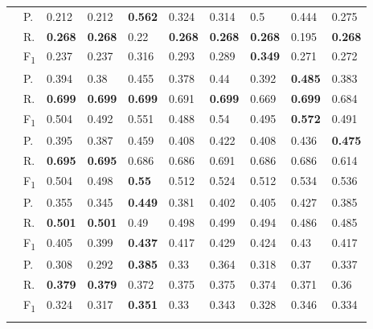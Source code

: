 \begin{tabularx}{\textwidth}{p{1.3em}l Z  Z  Z  Z  Z  Z  Z  Z }
    & P.    & 0.212    & 0.212    & \textbf{ 0.562 }    & 0.324    & 0.314    & 0.5    & 0.444    & 0.275 \\
    & R.    & \textbf{ 0.268 }    & \textbf{ 0.268 }    & 0.22    & \textbf{ 0.268 }    & \textbf{ 0.268 }    & \textbf{ 0.268 }    & 0.195    & \textbf{ 0.268 } \\
    & F\textsubscript{1}    & 0.237    & 0.237    & 0.316    & 0.293    & 0.289    & \textbf{ 0.349 }    & 0.271    & 0.272 \\
     \midrule {}

    & P.    & 0.394    & 0.38    & 0.455    & 0.378    & 0.44    & 0.392    & \textbf{ 0.485 }    & 0.383 \\
    & R.    & \textbf{ 0.699 }    & \textbf{ 0.699 }    & \textbf{ 0.699 }    & 0.691    & \textbf{ 0.699 }    & 0.669    & \textbf{ 0.699 }    & 0.684 \\
    & F\textsubscript{1}    & 0.504    & 0.492    & 0.551    & 0.488    & 0.54    & 0.495    & \textbf{ 0.572 }    & 0.491 \\
     \midrule {}

    & P.    & 0.395    & 0.387    & 0.459    & 0.408    & 0.422    & 0.408    & 0.436    & \textbf{ 0.475 } \\
    & R.    & \textbf{ 0.695 }    & \textbf{ 0.695 }    & 0.686    & 0.686    & 0.691    & 0.686    & 0.686    & 0.614 \\
    & F\textsubscript{1}    & 0.504    & 0.498    & \textbf{ 0.55 }    & 0.512    & 0.524    & 0.512    & 0.534    & 0.536 \\
     \midrule {}

    & P.    & 0.355    & 0.345    & \textbf{ 0.449 }    & 0.381    & 0.402    & 0.405    & 0.427    & 0.385 \\
    & R.    & \textbf{ 0.501 }    & \textbf{ 0.501 }    & 0.49    & 0.498    & 0.499    & 0.494    & 0.486    & 0.485 \\
    & F\textsubscript{1}    & 0.405    & 0.399    & \textbf{ 0.437 }    & 0.417    & 0.429    & 0.424    & 0.43    & 0.417 \\
     \midrule {}

    & P.    & 0.308    & 0.292    & \textbf{ 0.385 }    & 0.33    & 0.364    & 0.318    & 0.37    & 0.337 \\
    & R.    & \textbf{ 0.379 }    & \textbf{ 0.379 }    & 0.372    & 0.375    & 0.375    & 0.374    & 0.371    & 0.36 \\
    & F\textsubscript{1}    & 0.324    & 0.317    & \textbf{ 0.351 }    & 0.33    & 0.343    & 0.328    & 0.346    & 0.334 \\
     \midrule {}

\end{tabularx}